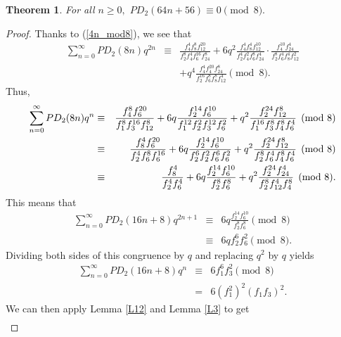 \documentclass{amsart}
\newtheorem{theorem}{Theorem}[section]
\begin{document}
\begin{theorem}
\label{64n56_mod8}
For all $n\geq 0,$ $PD_2(64n+56)\equiv 0 \pmod{8}.$    
\end{theorem}
\begin{proof}
Thanks to (\ref{4n_mod8}), we see that
\begin{eqnarray*}
\sum_{n=0}^\infty PD_2(8n)q^{2n} 
&\equiv & 
\frac{f_4^4f_8^8f_{12}^{20}}{f_2^8f_4^4f_6^{16}f_{24}^8} + 6q^2\frac{f_4^4f_8^4f_{12}^{10}}{f_2^4f_4^2f_6^8f_{24}^4} \cdot \frac{f_4^{10}f_{24}^4}{f_2^8f_6^4f_8^4f_{12}^2} \\
&\ \ \ & + q^4\frac{f_4^{4}f_4^{20}f_{24}^8}{f_2^{16}f_6^8f_8^8f_{12}^4} \pmod{8}.
\end{eqnarray*}
Thus, 
\begin{eqnarray}
\sum_{n=0}^\infty PD_2(8n)q^{n} 
&\equiv & 
\frac{f_4^8f_{6}^{20}}{f_1^8f_3^{16}f_{12}^8} + 6q\frac{f_2^{14}f_{6}^{10}}{f_1^{12}f_2^2f_3^{12}f_{6}^2} +q^2\frac{f_2^{24}f_{12}^8}{f_1^{16}f_3^8f_4^8f_{6}^4} \pmod{8} \notag \\
&\equiv & 
\frac{f_8^4f_{6}^{20}}{f_2^4f_6^{8}f_{6}^{16}} + 6q\frac{f_2^{14}f_{6}^{10}}{f_2^{6}f_2^2f_6^{6}f_{6}^2} +q^2\frac{f_2^{24}f_{12}^8}{f_2^{8}f_6^4f_4^8f_{6}^4} \pmod{8} \notag \\
&\equiv & 
\frac{f_8^4}{f_2^4f_6^{4}} + 6q\frac{f_2^{14}f_{6}^{10}}{f_2^{8}f_6^{8}} +q^2\frac{f_2^{24}f_{24}^4}{f_2^{8}f_{12}^4f_4^8} \pmod{8}. \label{8n_mod8}
\end{eqnarray}
This means that 
\begin{eqnarray*}
\sum_{n=0}^\infty PD_2(16n+8)q^{2n+1} 
&\equiv & 
6q\frac{f_2^{14}f_{6}^{10}}{f_2^{8}f_6^{8}}  \pmod{8} \\
&\equiv & 
6q f_2^6f_6^2 \pmod{8}.
\end{eqnarray*}
Dividing both sides of this congruence by $q$ and replacing $q^2$ by $q$ yields 
\begin{eqnarray*}
\sum_{n=0}^\infty PD_2(16n+8)q^{n} 
&\equiv & 
6 f_1^6f_3^2 \pmod{8} \\
&= & 
6 (f_1^2)^2(f_1f_3)^2.
\end{eqnarray*}
We can then apply Lemma \ref{L12} and Lemma \ref{L3} to get 
\begin{eqnarray*}

\end{eqnarray*}
\end{proof}
\end{document}
